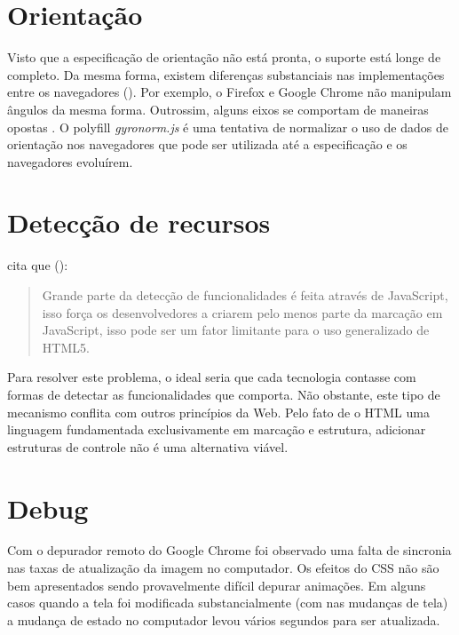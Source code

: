 \section{Orientação}

Visto que a especificação de orientação não está pronta,
o suporte está longe de completo. Da mesma forma, existem
diferenças substanciais nas implementações entre os navegadores
(). Por exemplo, o Firefox e Google
Chrome não manipulam ângulos da mesma forma. Outrossim, alguns
eixos se comportam de maneiras opostas \autocite{mdnOrientation}. O
polyfill \textit{gyronorm.js} é uma tentativa de normalizar o uso de
dados de orientação nos navegadores que pode ser utilizada até a
especificação e os navegadores evoluírem.

\section{Detecção de recursos}

\citet{diveIntohtml} cita que ():
\begin{quote}
Grande parte da detecção de funcionalidades é feita através de
JavaScript, isso força os desenvolvedores a criarem pelo menos parte da
marcação em JavaScript, isso pode ser um fator limitante para o uso
generalizado de HTML5.
\end{quote}

Para resolver este problema, o ideal seria que cada tecnologia contasse
com formas de detectar as funcionalidades que comporta. Não obstante,
este tipo de mecanismo conflita com outros princípios da Web. Pelo
fato de o HTML uma linguagem fundamentada exclusivamente em marcação
e estrutura, adicionar estruturas de controle não é uma alternativa
viável.

\section{Debug}

Com o depurador remoto do Google Chrome foi observado uma falta de
sincronia nas taxas de atualização da imagem no computador. Os
efeitos do CSS não são bem apresentados sendo provavelmente difícil
depurar animações. Em alguns casos quando a tela foi modificada
substancialmente (com nas mudanças de tela) a mudança de estado no
computador levou vários segundos para ser atualizada.

